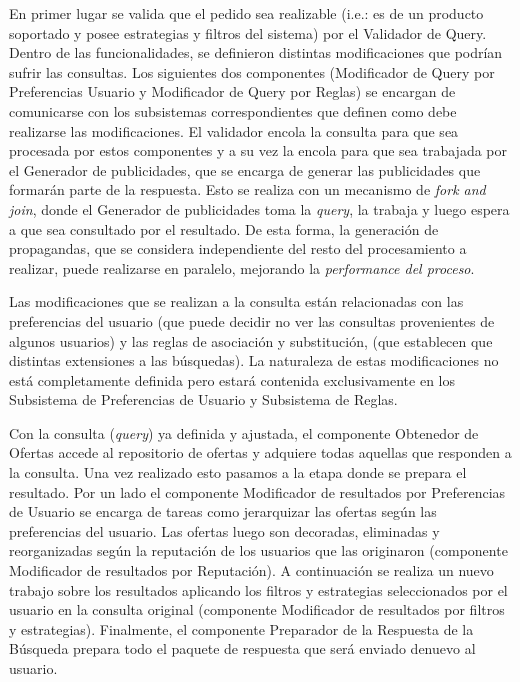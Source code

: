 En primer lugar se valida que el pedido sea realizable (i.e.: es de un producto soportado y posee estrategias y filtros del sistema) por el \textsf{Validador de Query}. Dentro de las funcionalidades, se definieron distintas modificaciones que podrían sufrir las consultas. Los siguientes dos componentes (\textsf{Modificador de Query por Preferencias Usuario} y \textsf{Modificador de Query por Reglas}) se encargan de comunicarse con los subsistemas correspondientes que definen como debe realizarse las modificaciones. El validador encola la consulta para que sea procesada por estos componentes y a su vez la encola para que sea trabajada por el \textsf{Generador de publicidades}, que se encarga de generar las publicidades que formarán parte de la respuesta. Esto se realiza con un mecanismo de \emph{fork and join}, donde el \textsf{Generador de publicidades} toma la \emph{query}, la trabaja y luego espera a que sea consultado por el resultado. De esta forma, la generación de propagandas, que se considera 
independiente del resto del procesamiento a realizar, puede realizarse en paralelo, mejorando la \emph{performance del proceso}.

Las modificaciones que se realizan a la consulta están relacionadas con las preferencias del usuario (que puede decidir no ver las consultas provenientes de algunos usuarios) y las reglas de asociación y substitución, (que establecen que distintas extensiones a las búsquedas). La naturaleza de estas modificaciones no está completamente definida pero estará contenida exclusivamente en los \textsf{Subsistema de Preferencias de Usuario} y \textsf{Subsistema de Reglas}. 

Con la consulta (\emph{query}) ya definida y ajustada, el componente \textsf{Obtenedor de Ofertas} accede al repositorio de ofertas y adquiere todas aquellas que responden a la consulta.  Una vez realizado esto pasamos a la etapa donde se prepara el resultado. Por un lado el componente \textsf{Modificador de resultados por Preferencias de Usuario} se encarga de tareas como jerarquizar las ofertas según las preferencias del usuario. Las ofertas luego son decoradas, eliminadas y reorganizadas según la reputación de los usuarios que las originaron (componente \textsf{Modificador de resultados por Reputación}). A continuación se realiza un nuevo trabajo sobre los resultados aplicando los filtros y estrategias seleccionados por el usuario en la consulta original (componente \textsf{Modificador de resultados por filtros y estrategias}). Finalmente, el componente \textsf{Preparador de la Respuesta de la Búsqueda} prepara todo el paquete de respuesta que será enviado denuevo al usuario. 

